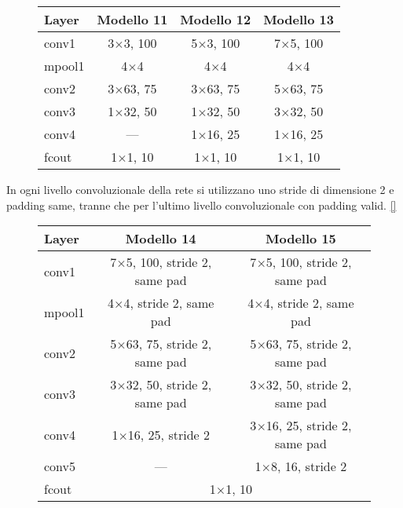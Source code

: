 \begin{figure}[H]
	\centering
	\begin{tabular}{lccc}
		\toprule
		\textbf{Layer} & \textbf{Modello 11} & \textbf{Modello 12} & \textbf{Modello 13}  	\\ 
		\midrule
		conv1 	& \num{3}$\times$\num{3}, 100	  & \num{5}$\times$\num{3}, 100 & \num{7}$\times$\num{5}, 100 	   \\
		mpool1 	& {\num{4}$\times$\num{4}}	&{\num{4}$\times$\num{4}}	& {\num{4}$\times$\num{4}}	 \\
		conv2  	& \num{3}$\times$\num{63}, 75 &  \num{3}$\times$\num{63}, 75	  &		\num{5}$\times$\num{63}, 75    \\
		conv3  	&\num{1}$\times$\num{32}, 50	  & \num{1}$\times$\num{32}, 50  &	\num{3}$\times$\num{32}, 50 	  \\
		conv4  	& ---	  & \num{1}$\times$\num{16}, 25  &	\num{1}$\times$\num{16}, 25 	  \\
		fcout	&{\num{1}$\times$\num{1}, 10} &{\num{1}$\times$\num{1}, 10}&{\num{1}$\times$\num{1}, 10}		   \\
		\bottomrule	
	\end{tabular}
	\label{tab:netemb4}
\end{figure}

In ogni livello convoluzionale della rete si utilizzano uno stride di dimensione 2 e padding same, tranne che per l'ultimo livello convoluzionale con padding valid. {\color{red} \ref{}}

\begin{figure}[H]
	\centering
	\begin{tabular}{lcc}
		\toprule
		\textbf{Layer} & \textbf{Modello 14} & \textbf{Modello 15}   	\\ 
		\midrule
		conv1 	& {\num{7}$\times$\num{5}, 100, stride 2, same pad}&{\num{7}$\times$\num{5}, 100, stride 2, same pad} \\
		mpool1 	& {\num{4}$\times$\num{4}, stride 2, same pad} &{\num{4}$\times$\num{4}, stride 2, same pad}  \\
		conv2  	& {\num{5}$\times$\num{63}, 75, stride 2, same pad}&{\num{5}$\times$\num{63}, 75, stride 2, same pad}    \\
		conv3  	&  {\num{3}$\times$\num{32}, 50, stride 2, same pad} &{\num{3}$\times$\num{32}, 50, stride 2, same pad} 	  \\
		conv4  	& \num{1}$\times$\num{16}, 25, stride 2  &	\num{3}$\times$\num{16}, 25, stride 2, same pad 	  \\
		conv5  	& ---  &	\num{1}$\times$\num{8}, 16, stride 2 	  \\
		fcout	& \multicolumn{2}{c}{\num{1}$\times$\num{1}, 10}		   \\
		\bottomrule	
	\end{tabular}
	\label{tab:rmsebin2}
\end{figure}


